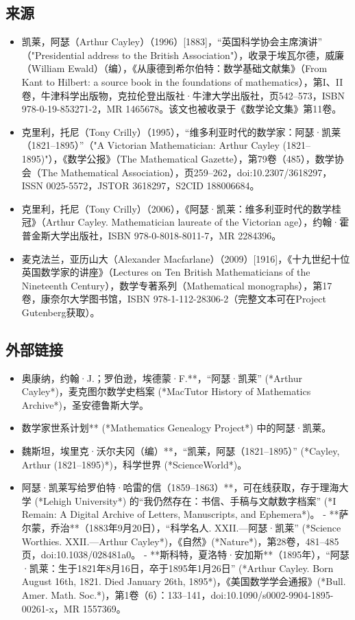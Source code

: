 \subsection{来源} 
\begin{itemize}
\item 凯莱，阿瑟（Arthur Cayley）（1996）[1883]，“英国科学协会主席演讲” （"Presidential address to the British Association"），收录于埃瓦尔德，威廉（William Ewald）（编），《从康德到希尔伯特：数学基础文献集》（From Kant to Hilbert: a source book in the foundations of mathematics），第I、II卷，牛津科学出版物，克拉伦登出版社·牛津大学出版社，页542–573，ISBN 978-0-19-853271-2，MR 1465678。该文也被收录于《数学论文集》第11卷。  
\item 克里利，托尼（Tony Crilly）（1995），“维多利亚时代的数学家：阿瑟·凯莱（1821–1895）”（"A Victorian Mathematician: Arthur Cayley (1821–1895)"），《数学公报》（The Mathematical Gazette），第79卷（485），数学协会（The Mathematical Association），页259–262，doi:10.2307/3618297，ISSN 0025-5572，JSTOR 3618297，S2CID 188006684。  
\item 克里利，托尼（Tony Crilly）（2006），《阿瑟·凯莱：维多利亚时代的数学桂冠》（Arthur Cayley. Mathematician laureate of the Victorian age），约翰·霍普金斯大学出版社，ISBN 978-0-8018-8011-7，MR 2284396。  
\item 麦克法兰，亚历山大（Alexander Macfarlane）（2009）[1916]，《十九世纪十位英国数学家的讲座》（Lectures on Ten British Mathematicians of the Nineteenth Century），数学专著系列（Mathematical monographs），第17卷，康奈尔大学图书馆，ISBN 978-1-112-28306-2（完整文本可在Project Gutenberg获取）。  
\end{itemize}
\subsection{外部链接}
\begin{itemize}
\item 奥康纳，约翰·J.；罗伯逊，埃德蒙·F.**，“阿瑟·凯莱” (*Arthur Cayley*)，麦克图尔数学史档案 (*MacTutor History of Mathematics Archive*)，圣安德鲁斯大学。  
\item 数学家世系计划** (*Mathematics Genealogy Project*) 中的阿瑟·凯莱。  
\item 魏斯坦，埃里克·沃尔夫冈（编）**，“凯莱，阿瑟（1821–1895）” (*Cayley, Arthur (1821–1895)*)，科学世界 (*ScienceWorld*)。  
\item 阿瑟·凯莱写给罗伯特·哈雷的信（1859–1863）**，可在线获取，存于理海大学 (*Lehigh University*) 的“我仍然存在：书信、手稿与文献数字档案” (*I Remain: A Digital Archive of Letters, Manuscripts, and Ephemera*)。  
- **萨尔蒙，乔治**（1883年9月20日），“科学名人. XXII.—阿瑟·凯莱” (*Science Worthies. XXII.—Arthur Cayley*)，《自然》(*Nature*)，第28卷，481–485页，doi:10.1038/028481a0。  
- **斯科特，夏洛特·安加斯**（1895年），“阿瑟·凯莱：生于1821年8月16日，卒于1895年1月26日” (*Arthur Cayley. Born August 16th, 1821. Died January 26th, 1895*)，《美国数学学会通报》(*Bull. Amer. Math. Soc.*)，第1卷（6）：133–141，doi:10.1090/s0002-9904-1895-00261-x，MR 1557369。  
\end{itemize}